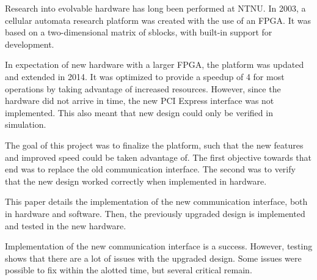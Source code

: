 %
Research into evolvable hardware has long been performed at NTNU.
In 2003, a cellular automata research platform was created with the use of an FPGA.
It was based on a two-dimensional matrix of sblocks, with built-in support for development.

In expectation of new hardware with a larger FPGA, the platform was updated and extended in 2014.
It was optimized to provide a speedup of 4 for most operations by taking advantage of increased resources.
However, since the hardware did not arrive in time, the new PCI Express interface was not implemented.
This also meant that new design could only be verified in simulation.

The goal of this project was to finalize the platform, such that the new features and improved speed could be taken advantage of.
The first objective towards that end was to replace the old communication interface.
The second was to verify that the new design worked correctly when implemented in hardware.


This paper details the implementation of the new communication interface, both in hardware and software.
Then, the previously upgraded design is implemented and tested in the new hardware.

Implementation of the new communication interface is a success.
However, testing shows that there are a lot of issues with the upgraded design.
Some issues were possible to fix within the alotted time, but several critical remain.


